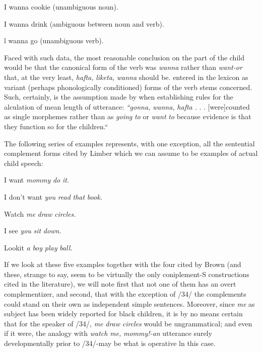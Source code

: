\ea\label{ex:29}
 I wanna cookie (unambiguous noun).
\z




\ea\label{ex:30}
 I wanna drink (ambiguous between noun and verb).
\z

\ea\label{ex:31}
 l wanna go (unambiguous verb).
\z

Faced with such data, the most reasonable conclusion on the part of the child would be that the canonical form of the verb was \textit{wanna} rather than \textit{want-or} that, at the very least, \textit{hafta,} \textit{liketa,} \textit{wanna} should be. entered in the lexicon as variant (perhaps phonologically condi\-tioned) forms of the verb stems concerned. Such, certainly, is the assumption made by \citet[54]{Brown1973} when establishing rules for the alculation of mean length of utterance: \textit{``gonna,} \textit{wanna,} \textit{hafta} \textit{.} . . [were]counted as single morphemes rather than as \textit{going} \textit{to} or \textit{want} \textit{to} because evidence is that they function so for the children.``

The following series of examples represents, with one exception, all the sentential complement forms cited by Limber which we can assume to be examples of actual child speech:

\ea\label{ex:32}
I want \textit{mommy} \textit{do} \textit{it.}
\z


\ea\label{ex:33}
 I don't want \textit{you} \textit{read} \textit{that} \textit{book.}
\z

\ea\label{ex:34}
 Watch \textit{me} \textit{draw} \textit{circles.}
\z

\ea\label{ex:35}
 I see \textit{you} \textit{sit} \textit{down.}
\z

\ea\label{ex:36}
 Lookit \textit{a} \textit{boy} \textit{play} \textit{ball.}
\z

If we look at these five examples together with the four cited by Brown (and these, strange to say, seem to be virtually the only coniplement-S constructions cited in the literature), we will note first that not one of them has an overt complementizer, and second,
that with the exception of /34/ the complements could stand on their own as independent simple sentences. Moreover, since \textit{me} as subject
has been widely reported for black children, it is by no means certain that for the speaker of /34/, \textit{me} \textit{draw} \textit{circles} would be ungrammatical; and even if it were, the analogy with \textit{watch} \textit{me,} \textit{mommy!-an} utterance surely developmentally prior to /34/-may be what is operative ln this case.

